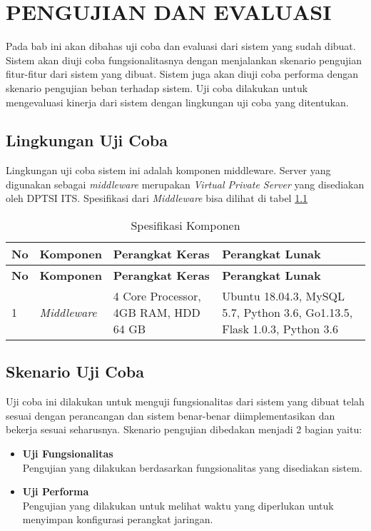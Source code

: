 \chapter{PENGUJIAN DAN EVALUASI}
Pada bab ini akan dibahas uji coba dan evaluasi dari sistem yang sudah dibuat. Sistem akan diuji coba fungsionalitasnya dengan menjalankan skenario pengujian fitur-fitur dari sistem yang dibuat. Sistem juga akan diuji coba performa dengan skenario pengujian beban terhadap sistem. Uji coba dilakukan untuk mengevaluasi kinerja dari sistem dengan lingkungan uji coba yang ditentukan.

\section{Lingkungan Uji Coba}
Lingkungan uji coba sistem ini adalah komponen middleware. Server yang digunakan sebagai \textit{middleware} merupakan \textit{Virtual Private Server} yang disediakan oleh DPTSI ITS. Spesifikasi dari \textit{Middleware} bisa dilihat di tabel \ref{tabelKomponen} 
   \begin{longtable}{|p{}|p{}|p{}|p{}|}
   	
   	\caption{Spesifikasi Komponen} \label{tabelKomponen} \\
   	\hline
   	\textbf{No} & \textbf{Komponen} & \textbf{Perangkat Keras} & \textbf{Perangkat Lunak} \\ \hline
   	\endfirsthead
   	
   	\hline
   	\textbf{No} & \textbf{Komponen} & \textbf{Perangkat Keras} & \textbf{Perangkat Lunak} \\ \hline
   	\endhead
   	\endfoot
   	\endlastfoot
   	
   	1 & \textit{Middleware} & 4 Core Processor, 4GB RAM, HDD 64 GB & Ubuntu 18.04.3, MySQL 5.7, Python 3.6, Go1.13.5, Flask 1.0.3, Python 3.6 \\ \hline
		
   	
   \end{longtable}

\section{Skenario Uji Coba}
Uji coba ini dilakukan untuk menguji fungsionalitas dari sistem yang dibuat telah sesuai dengan perancangan dan sistem benar-benar diimplementasikan dan bekerja sesuai seharusnya. Skenario pengujian dibedakan menjadi 2 bagian yaitu:
\begin{itemize}
	\item \textbf{Uji Fungsionalitas} \\
	Pengujian yang dilakukan berdasarkan fungsionalitas yang disediakan sistem.
	\item \textbf{Uji Performa} \\
	Pengujian yang dilakukan untuk melihat waktu yang diperlukan untuk menyimpan konfigurasi perangkat jaringan.
\end{itemize}  
	
